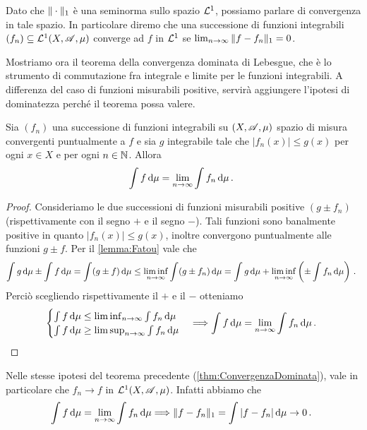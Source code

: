 \begin{remark}
	Dato che $\Vert \cdot\Vert_1$ è una seminorma sullo spazio $\mathcal L^1$, possiamo parlare di convergenza in tale spazio. In particolare diremo che una successione di funzioni integrabili $(f_n)\subseteq \mathcal L^1(X,\mathscr A,\mu)$ converge ad $f$ in $\mathcal L^1$ se $\lim_{n\to\infty}\Vert f-f_n\Vert_1=0$.
\end{remark}

Mostriamo ora il teorema della convergenza dominata di Lebesgue, che è lo strumento di commutazione fra integrale e limite per le funzioni integrabili. A differenza del caso di funzioni misurabili positive, servirà aggiungere l'ipotesi di dominatezza perché il teorema possa valere.

\begin{theorem}\label{thm:ConvergenzaDominata}
	Sia $(f_n)$ una successione di funzioni integrabili su $(X,\mathscr A,\mu)$ spazio di misura convergenti puntualmente a $f$ e sia $g$ integrabile tale che $|f_n(x)|\le g(x)$ per ogni $x\in X$ e per ogni $n\in\mathbb N$. Allora
	\begin{equation*}
		\int f \,\mathrm d\mu=\lim_{n\to\infty}\int f_n\,\mathrm d\mu\, \text{. }
	\end{equation*}
\end{theorem}
\begin{proof}
	Consideriamo le due successioni di funzioni misurabili positive $(g\pm f_n)$ (rispettivamente con il segno $+$ e il segno $-$). Tali funzioni sono banalmente positive in quanto $|f_n(x)|\le g(x)$, inoltre convergono puntualmente alle funzioni $g\pm f$. Per il \cref{lemma:Fatou} vale che
	\begin{equation*}
		\int g\,\mathrm d\mu\pm\int f\,\mathrm d\mu=\int (g\pm f) \,\mathrm d\mu \le \liminf_{n\to\infty} \int (g\pm f_n) \,\mathrm d\mu=\int g\,\mathrm d\mu +\liminf_{n\to\infty}\left( \pm\int f_n \,\mathrm d \mu\right)\, \text{. }
	\end{equation*}
	Perciò scegliendo rispettivamente il $+$ e il $-$ otteniamo
	\begin{equation*}
		\begin{cases}
			\int f \,\mathrm d\mu\le \liminf_{n\to\infty}\int f_n \,\mathrm d \mu \\
			\int f\,\mathrm d\mu \ge \limsup_{n\to\infty}\int f_n \,\mathrm d \mu
		\end{cases}
		\Longrightarrow \int f\,\mathrm d\mu = \lim_{n\to\infty}\int f_n \,\mathrm d \mu\, \text{. }
	\end{equation*}
\end{proof}

\begin{remark}\label{nota:ConvergenzaL1Dominata}
	Nelle stesse ipotesi del teorema precedente (\cref{thm:ConvergenzaDominata}), vale in particolare che $f_n\to f$ in $\mathcal L^1(X,\mathscr A,\mu)$. Infatti abbiamo che
	\begin{equation*}
		\int f \,\mathrm d\mu=\lim_{n\to\infty}\int f_n\,\mathrm d\mu \Longrightarrow \Vert f-f_n\Vert_1=\int |f-f_n|\,\mathrm d\mu\to 0\, \text{. }
	\end{equation*}
\end{remark}

